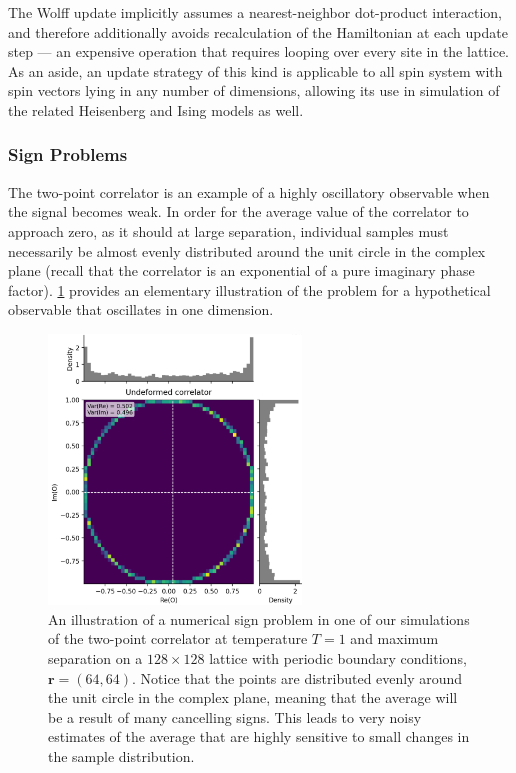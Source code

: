 \documentclass[12pt]{article}
\begin{document}
The Wolff update implicitly assumes a nearest-neighbor dot-product interaction, and therefore additionally avoids recalculation of the Hamiltonian at each update step ---
an expensive operation that requires looping over every site in the lattice. As an aside, an update strategy of this kind is applicable to all spin system with spin vectors
lying in any number of dimensions, allowing its use in simulation of the related Heisenberg and Ising models as well.

\subsubsection{Sign Problems}

The two-point correlator is an example of a highly oscillatory observable when the signal becomes weak. In order for the average value of the correlator to approach zero, 
as it should at large separation, individual samples must necessarily be almost evenly distributed around the unit circle in the complex plane (recall that the correlator 
is an exponential of a pure imaginary phase factor). \ref{fig:sign_problem} provides an elementary illustration of the problem for a hypothetical observable that oscillates 
in one dimension.

\begin{figure}[h]
	\centering
	\includegraphics[width=0.6\textwidth]{figures/example_hist.png}
	\caption[Sign Problem Illustration]{An illustration of a numerical sign problem in one of our simulations of the two-point correlator at temperature $T=1$
	and maximum separation on a $128\times 128$ lattice with periodic boundary conditions, $\mathbf{r}=(64,64)$. Notice that the points are
	distributed evenly around the unit circle in the complex plane, meaning that the average will be a result of many cancelling signs. This leads
	to very noisy estimates of the average that are highly sensitive to small changes in the sample distribution.}
	\label{fig:sign_problem}
\end{figure}
\end{document}
